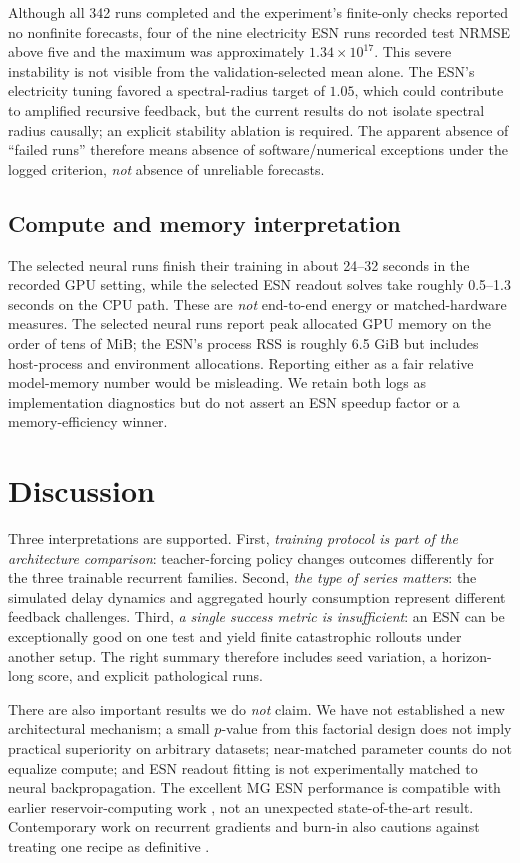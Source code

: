 \documentclass[final,5p,times,twocolumn]{elsarticle}
\begin{document}
Although all 342 runs completed and the experiment's finite-only checks reported no nonfinite forecasts, four of the nine electricity ESN runs recorded test NRMSE above five and the maximum was approximately $1.34\times10^{17}$. This severe instability is not visible from the validation-selected mean alone. The ESN's electricity tuning favored a spectral-radius target of $1.05$, which could contribute to amplified recursive feedback, but the current results do not isolate spectral radius causally; an explicit stability ablation is required. The apparent absence of ``failed runs'' therefore means absence of software/numerical exceptions under the logged criterion, \emph{not} absence of unreliable forecasts.

\subsection{Compute and memory interpretation}
The selected neural runs finish their training in about 24--32 seconds in the recorded GPU setting, while the selected ESN readout solves take roughly 0.5--1.3 seconds on the CPU path. These are \emph{not} end-to-end energy or matched-hardware measures. The selected neural runs report peak allocated GPU memory on the order of tens of MiB; the ESN's process RSS is roughly 6.5 GiB but includes host-process and environment allocations. Reporting either as a fair relative model-memory number would be misleading. We retain both logs as implementation diagnostics but do not assert an ESN speedup factor or a memory-efficiency winner.

\section{Discussion}

Three interpretations are supported. First, \emph{training protocol is part of the architecture comparison}: teacher-forcing policy changes outcomes differently for the three trainable recurrent families. Second, \emph{the type of series matters}: the simulated delay dynamics and aggregated hourly consumption represent different feedback challenges. Third, \emph{a single success metric is insufficient}: an ESN can be exceptionally good on one test and yield finite catastrophic rollouts under another setup. The right summary therefore includes seed variation, a horizon-long score, and explicit pathological runs.

There are also important results we do \emph{not} claim. We have not established a new architectural mechanism; a small $p$-value from this factorial design does not imply practical superiority on arbitrary datasets; near-matched parameter counts do not equalize compute; and ESN readout fitting is not experimentally matched to neural backpropagation. The excellent MG ESN performance is compatible with earlier reservoir-computing work \cite{shahi2022prediction}, not an unexpected state-of-the-art result. Contemporary work on recurrent gradients and burn-in also cautions against treating one recipe as definitive \cite{johnston2025revisiting,schiller2026burnin}.
\end{document}
